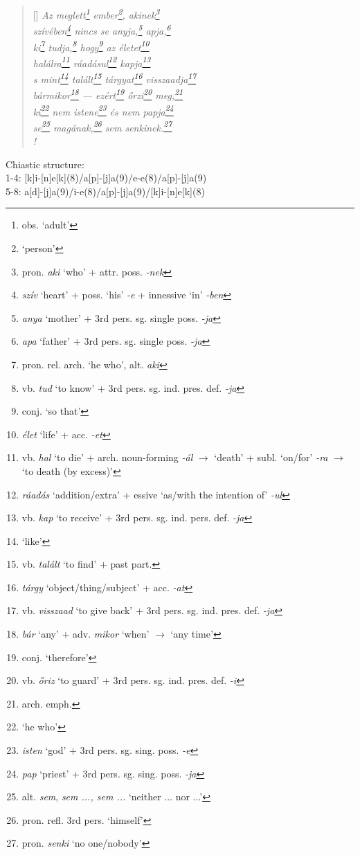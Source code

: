 \documentclass[a4paper,12pt,twoside,final]{book}
\begin{document}
\begin{verse}[\versewidth]
  \it
  Az meglett\footnote{obs. `adult'} ember\footnote{`person'},
  akinek\footnote{pron. \emph{aki} `who' + attr. poss. \emph{-nek}} \\
  szívében\footnote{\emph{szív} `heart' + poss. `his' \emph{-e} +
  innessive `in' \emph{-ben}} nincs se anyja,\footnote{\emph{anya}
  `mother' + 3rd pers. sg. single poss. \emph{-ja}}
  apja,\footnote{\emph{apa} `father' + 3rd pers. sg. single
  poss. \emph{-ja}} \\
  ki\footnote{pron. rel. arch. `he who', alt. \emph{aki}}
  tudja,\footnote{vb. \emph{tud} `to know' + 3rd
  pers. sg. ind. pres. def. \emph{-ja}}
  hogy\footnote{conj. `so that'} az életet\footnote{\emph{élet}
  `life' + acc. \emph{-et}} \\
  halálra\footnote{vb. \emph{hal} `to die' + arch. noun-forming
  \emph{-ál} $\rightarrow$ `death' + subl. `on/for' \emph{-ra}
  $\rightarrow$ `to death (by excess)'}
  ráadásul\footnote{\emph{ráadás} `addition/extra' + essive
  `as/with the intention of' \emph{-ul}}
  kapja\footnote{vb. \emph{kap} `to receive' + 3rd
  pers. sg. ind. pers. def. \emph{-ja}} \\
  s mint\footnote{`like'} talált\footnote{vb. \emph{talált} `to
  find' + past part.} tárgyat\footnote{\emph{tárgy}
  `object/thing/subject' + acc. \emph{-at}}
  visszaadja\footnote{vb. \emph{visszaad} `to give back' + 3rd
  pers. sg. ind. pres. def. \emph{-ja}} \\
  bármikor\footnote{\emph{bár} `any' + adv. \emph{mikor} `when'
  $\rightarrow$ `any time'} --- ezért\footnote{conj. `therefore'}
  őrzi\footnote{vb. \emph{őriz} `to guard' + 3rd
  pers. sg. ind. pres. def. \emph{-i}} meg,\footnote{arch. emph.} \\
  ki\footnote{`he who'} nem istene\footnote{\emph{isten} `god' +
  3rd pers. sg. sing. poss. \emph{-e}} és nem
  papja\footnote{\emph{pap} `priest' + 3rd
  pers. sg. sing. poss. \emph{-ja}} \\
  se\footnote{alt. \emph{sem}, \emph{sem ..., sem ...}  `neither
  ... nor ...'} magának,\footnote{pron. refl. 3rd pers. `himself'}
  sem senkinek.\footnote{pron. \emph{senki} `no one/nobody'} \\!
\end{verse}

\noindent Chiastic structure: \\
1-4: [k]i-[n]e[k](8)/a[p]-[j]a(9)/e-e(8)/a[p]-[j]a(9)\\
5-8: a[d]-[j]a(9)/i-e(8)/a[p]-[j]a(9)/[k]i-[n]e[k](8)
\end{document}
